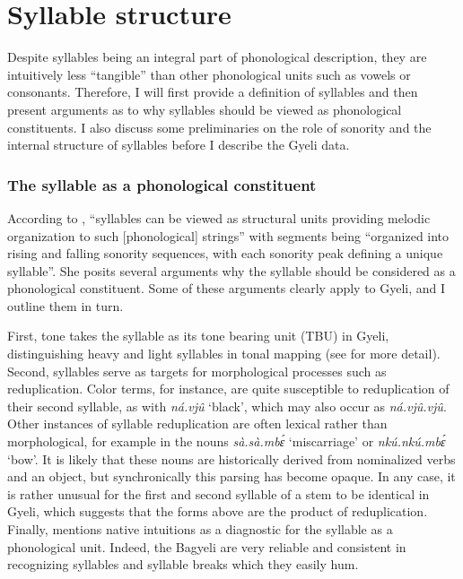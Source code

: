 \section{Syllable structure}
\label{sec:Syllable}


Despite syllables being an integral part of phonological description, they are intuitively less ``tangible'' than other phonological units such as vowels or consonants. Therefore, I will first provide a definition of syllables and then present arguments as to why syllables should be viewed as phonological constituents. I also discuss some preliminaries on the role of sonority and the internal structure of syllables before I describe the Gyeli data. 

\subsubsection*{The syllable as a phonological constituent} 
According to \citet[207]{blevins95}, ``syllables can be viewed as structural units providing melodic organization to such [phonological] strings''  with segments being ``organized into rising and falling sonority sequences, with each sonority peak defining a unique syllable''. She posits several arguments why the syllable should be considered as a phonological constituent. Some of these arguments clearly apply to Gyeli, and I outline them in turn.

First, tone takes the syllable as its tone bearing unit (TBU) in Gyeli, distinguishing heavy and light syllables in tonal mapping (see  for more detail). 
Second, syllables serve as targets for morphological processes such as reduplication. Color terms, for instance, are quite susceptible to reduplication of their second syllable, as with {\itshape ná.vjû} `black', which may also occur as {\itshape ná.vjû.vjû}. Other instances of syllable reduplication are often lexical rather than morphological, for example in the nouns {\itshape sà.sà.mbɛ́} `miscarriage' or {\itshape nkú.nkú.mbɛ́} `bow'. It is likely that these nouns are historically derived from nominalized verbs and an object, but synchronically this parsing has become opaque. In any case, it is rather unusual for the first and second syllable of a stem to be identical in Gyeli, which suggests that the forms above are the product of reduplication.
Finally, \citet[209]{blevins95} mentions native intuitions as a diagnostic for the syllable as a phonological unit. Indeed, the Bagyeli are very reliable and consistent in recognizing syllables and syllable breaks which they easily hum.


